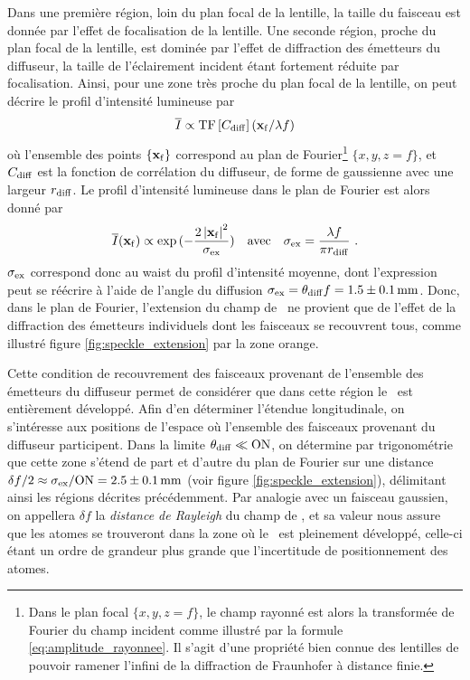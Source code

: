 Dans une première région, loin du plan focal de la lentille, la taille du faisceau est donnée par l'effet de focalisation de la lentille. Une seconde région, proche du plan focal de la lentille, est dominée par l'effet de diffraction des émetteurs du diffuseur, la taille de l'éclairement incident étant fortement réduite par focalisation. Ainsi, pour une zone très proche du plan focal de la lentille, on peut décrire le profil d'intensité lumineuse par 
\begin{equation}
\overline{I}\propto \mathrm{TF} \left[ C_{\mathrm{diff}} \right] (\mathbf{x}_{\mathrm{f}}/\lambda f)
\end{equation}
où l'ensemble des points $\lbrace \mathbf{x}_{\mathrm{f}} \rbrace$ correspond au plan de Fourier\footnote{Dans le plan focal $\lbrace x,y,z=f\rbrace$, le champ rayonné est alors la transformée de Fourier du champ incident comme illustré par la formule \ref{eq:amplitude_rayonnee}. Il s'agit d'une propriété bien connue des lentilles de pouvoir ramener l'infini de la diffraction de Fraunhofer à distance finie.} $\lbrace x,y,z=f \rbrace$, et $C_{\mathrm{diff}}$ est la fonction de corrélation du diffuseur, de forme de gaussienne avec une largeur $r_{\mathrm{diff}}$. Le profil d'intensité lumineuse dans le plan de Fourier est alors donné par 
\begin{equation}
\overline{I}(\mathbf{x}_{\mathrm{f}})\propto \exp{(-\frac{2 \left| \mathbf{x}_{\mathrm{f}}\right|^2}{\sigma_{\mathrm{ex}}})} \quad \text{avec} \quad \sigma_{\mathrm{ex}} = \frac{\lambda f}{\pi r_{\mathrm{diff}}} \text{ .}
\label{eq:intensite_moyenne_speckle}
\end{equation}
$\sigma_{\mathrm{ex}}$ correspond donc au waist du profil d'intensité moyenne, dont l'expression peut se réécrire à l'aide de l'angle du diffusion $\sigma_{\mathrm{ex}}=\theta_{\mathrm{diff}} f = 1.5\pm\SI{0.1}{\milli\metre}$. Donc, dans le plan de Fourier, l'extension du champ de \speckle\ ne provient que de l'effet de la diffraction des émetteurs individuels dont les faisceaux se recouvrent tous, comme illustré figure \ref{fig:speckle_extension} par la zone orange.

Cette condition de recouvrement des faisceaux provenant de l'ensemble des émetteurs du diffuseur permet de considérer que dans cette région le \speckle\ est entièrement développé. Afin d'en déterminer l'étendue longitudinale, on s'intéresse aux positions de l'espace où l'ensemble des faisceaux provenant du diffuseur participent. Dans la limite $\theta_{\mathrm{diff}} \ll \mathrm{ON}$, on détermine par trigonométrie que cette zone s'étend de part et d'autre du plan de Fourier sur une distance $\delta f/2\approx \sigma_{\mathrm{ex}} /\mathrm{ON} =2.5\pm\SI{0.1}{\milli\metre}$ (voir figure \ref{fig:speckle_extension}), délimitant ainsi les régions décrites précédemment. Par analogie avec un faisceau gaussien, on appellera $\delta f$ la \emph{distance de Rayleigh} du champ de \speckle , et sa valeur nous assure que les atomes se trouveront dans la zone où le \speckle\ est pleinement développé, celle-ci étant un ordre de grandeur plus grande que l'incertitude de positionnement des atomes.















